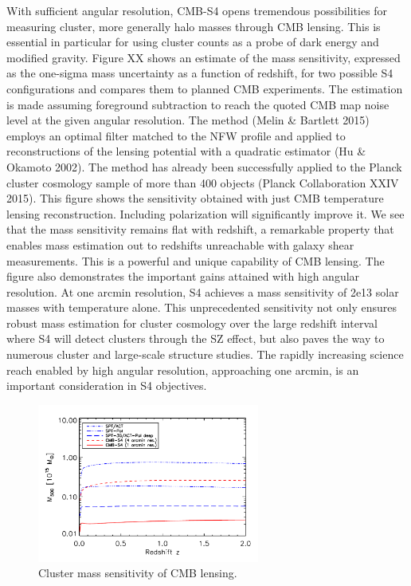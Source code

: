With sufficient angular resolution, CMB-S4 opens tremendous possibilities for measuring cluster, more generally halo masses through CMB lensing.  This is essential in particular for using cluster counts as a probe of dark energy and modified gravity.  Figure XX shows an estimate of the mass sensitivity, expressed as the one-sigma mass uncertainty as a function of redshift, for two possible S4 configurations and compares them to planned CMB experiments. 
	The estimation is made assuming foreground subtraction to reach the quoted CMB map noise level at the given angular resolution.  The method (Melin \& Bartlett 2015) employs an optimal filter matched to the NFW profile and applied to reconstructions of the lensing potential with a quadratic estimator (Hu \& Okamoto 2002).  The method has already been successfully applied to the Planck cluster cosmology sample of more than 400 objects (Planck Collaboration XXIV 2015).  This figure shows the sensitivity obtained with just CMB temperature lensing reconstruction.  Including polarization will significantly improve it.  
	We see that the mass sensitivity remains flat with redshift, a remarkable property that enables mass estimation out to redshifts unreachable with galaxy shear measurements.  This is a powerful and unique capability of CMB lensing.  The figure also demonstrates the important gains attained with high angular resolution.  At one arcmin resolution, S4 achieves a mass sensitivity of 2e13 solar masses with temperature alone.  This unprecedented sensitivity not only ensures robust mass estimation for cluster cosmology over the large redshift interval where S4 will detect clusters through the SZ effect, but also paves the way to numerous cluster and large-scale structure studies.  The rapidly increasing science reach enabled by high angular resolution, approaching one arcmin, is an important consideration in S4 objectives.  

\begin{figure}[t!]
\begin{center}
\includegraphics[width=0.65\textwidth]{DarkEnergy/m500lim_vs_z_1sigma_cmbs4_v1.pdf}
\caption{Cluster mass sensitivity of CMB lensing.}
\label{fig:limits}
\end{center}
\end{figure} 

